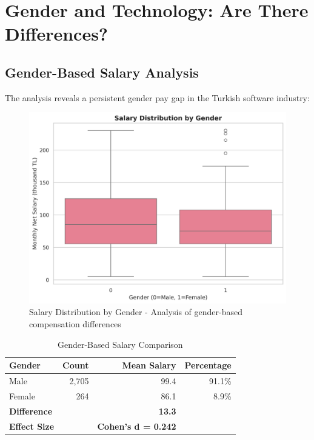 \documentclass[12pt,a4paper]{article}
\begin{document}
\section{Gender and Technology: Are There Differences?}

\subsection{Gender-Based Salary Analysis}
The analysis reveals a persistent gender pay gap in the Turkish software industry:

\begin{figure}[H]
    \centering
    \includegraphics[width=\textwidth]{figures/boxplot_gender.png}
    \caption{Salary Distribution by Gender - Analysis of gender-based compensation differences}
\end{figure}

\begin{table}[H]
\centering
\begin{tabular}{lrrr}
\toprule
\textbf{Gender} & \textbf{Count} & \textbf{Mean Salary} & \textbf{Percentage} \\
\midrule
Male & 2,705 & 99.4 & 91.1\% \\
Female & 264 & 86.1 & 8.9\% \\
\midrule
\textbf{Difference} & & \textbf{13.3} & \\
\textbf{Effect Size} & & \textbf{Cohen's d = 0.242} & \\
\bottomrule
\end{tabular}
\caption{Gender-Based Salary Comparison}
\end{table}
\end{document}

